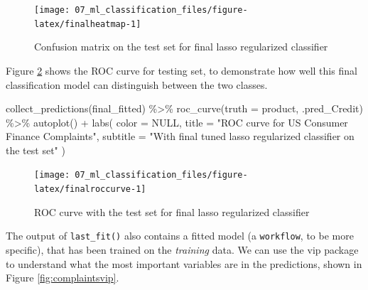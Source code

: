 \documentclass[
]{krantz}
\makeatletter
\newenvironment{Shaded}{\begin{snugshade}}{\end{snugshade}}
\newcommand{\AttributeTok}[1]{\textcolor[rgb]{0.77,0.63,0.00}{#1}}
\newcommand{\ConstantTok}[1]{\textcolor[rgb]{0.00,0.00,0.00}{#1}}
\newcommand{\FunctionTok}[1]{\textcolor[rgb]{0.00,0.00,0.00}{#1}}
\newcommand{\NormalTok}[1]{#1}
\newcommand{\SpecialCharTok}[1]{\textcolor[rgb]{0.00,0.00,0.00}{#1}}
\newcommand{\StringTok}[1]{\textcolor[rgb]{0.31,0.60,0.02}{#1}}
\newenvironment{kframe}{%
\medskip{}
\setlength{\fboxsep}{.8em}
 \def\at@end@of@kframe{}%
 \ifinner\ifhmode%
  \def\at@end@of@kframe{\end{minipage}}%
  \begin{minipage}{\columnwidth}%
 \fi\fi%
 \def\FrameCommand##1{\hskip\@totalleftmargin \hskip-\fboxsep
 \colorbox{shadecolor}{##1}\hskip-\fboxsep
     \hskip-\linewidth \hskip-\@totalleftmargin \hskip\columnwidth}%
 \MakeFramed {\advance\hsize-\width
   \@totalleftmargin\z@ \linewidth\hsize
   \@setminipage}}%
 {\par\unskip\endMakeFramed%
 \at@end@of@kframe}
\renewenvironment{Shaded}{\begin{kframe}}{\end{kframe}}
\makeatother
\begin{document}
\begin{figure}

{\centering \texttt{[image: 07\_ml\_classification\_files/figure-latex/finalheatmap-1]} 

}

\caption{Confusion matrix on the test set for final lasso regularized classifier}\label{fig:finalheatmap}
\end{figure}

Figure \ref{fig:finalroccurve} shows the ROC curve for testing set, to demonstrate how well this final classification model can distinguish between the two classes.

\begin{Shaded}
\begin{Highlighting}[]
\FunctionTok{collect\_predictions}\NormalTok{(final\_fitted)  }\SpecialCharTok{\%\textgreater{}\%}
  \FunctionTok{roc\_curve}\NormalTok{(}\AttributeTok{truth =}\NormalTok{ product, .pred\_Credit) }\SpecialCharTok{\%\textgreater{}\%}
  \FunctionTok{autoplot}\NormalTok{() }\SpecialCharTok{+}
  \FunctionTok{labs}\NormalTok{(}
    \AttributeTok{color =} \ConstantTok{NULL}\NormalTok{,}
    \AttributeTok{title =} \StringTok{"ROC curve for US Consumer Finance Complaints"}\NormalTok{,}
    \AttributeTok{subtitle =} \StringTok{"With final tuned lasso regularized classifier on the test set"}
\NormalTok{  )}
\end{Highlighting}
\end{Shaded}

\begin{figure}

{\centering \texttt{[image: 07\_ml\_classification\_files/figure-latex/finalroccurve-1]} 

}

\caption{ROC curve with the test set for final lasso regularized classifier}\label{fig:finalroccurve}
\end{figure}

The output of \texttt{last\_fit()} also contains a fitted model (a \texttt{workflow}, to be more specific), that has been trained on the \emph{training} data. We can use the vip package to understand what the most important variables are in the predictions, shown in Figure \ref{fig:complaintsvip}.
\end{document}
